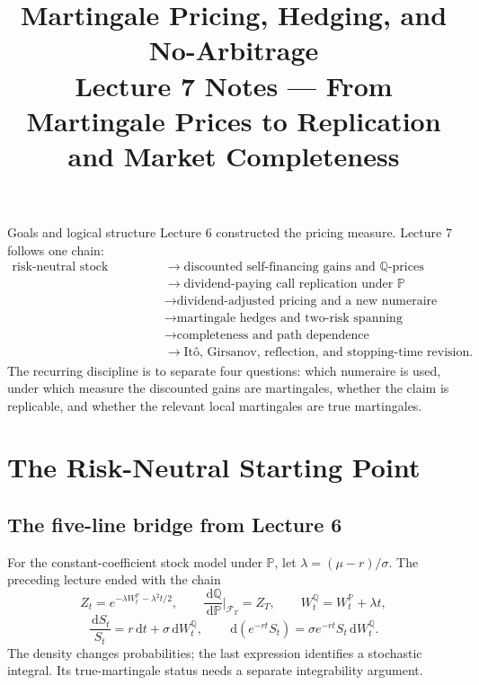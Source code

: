 \documentclass[10pt]{article}
\title{\textbf{Martingale Pricing, Hedging, and No-Arbitrage}\\
\large Lecture 7 Notes --- From Martingale Prices to Replication and Market Completeness}
\author{}
\date{}
\newcommand{\Pp}{\mathbb P}
\newcommand{\Q}{\mathbb Q}
\newcommand{\1}{\mathbf 1}
\newcommand{\cF}{\mathcal F}
\newcommand{\dd}{\,\mathrm d}
\theoremstyle{definition}
\begin{document}
\maketitle
\vspace{-1.4em}

\begin{keyidea}{Goals and logical structure}
Lecture 6 constructed the pricing measure. Lecture 7 follows one chain:
\[
\begin{aligned}
\text{risk-neutral stock dynamics}
&\longrightarrow \text{discounted self-financing gains and }\Q\text{-prices}\\
&\longrightarrow \text{dividend-paying call replication under }\Pp\\
&\longrightarrow \text{dividend-adjusted pricing and a new numeraire}\\
&\longrightarrow \text{martingale hedges and two-risk spanning}\\
&\longrightarrow \text{completeness and path dependence}\\
&\longrightarrow \text{It\^o, Girsanov, reflection, and stopping-time revision}.
\end{aligned}
\]
The recurring discipline is to separate four questions: which numeraire is
used, under which measure the discounted gains are martingales, whether the
claim is replicable, and whether the relevant local martingales are true
martingales.
\end{keyidea}

\section{The Risk-Neutral Starting Point}

\subsection{The five-line bridge from Lecture 6}

For the constant-coefficient stock model under \(\Pp\), let
\(\lambda=(\mu-r)/\sigma\). The preceding lecture ended with the chain
\[
Z_t=e^{-\lambda W_t^{\Pp}-\lambda^2t/2},\qquad
\frac{\dd\Q}{\dd\Pp}\bigg|_{\cF_T}=Z_T,\qquad
W_t^{\Q}=W_t^{\Pp}+\lambda t,
\]
\[
\frac{\dd S_t}{S_t}=r\dd t+\sigma\dd W_t^{\Q},\qquad
\dd(e^{-rt}S_t)=\sigma e^{-rt}S_t\dd W_t^{\Q}.
\]
The density changes probabilities; the last expression identifies a
stochastic integral. Its true-martingale status needs a separate
integrability argument.
\end{document}
